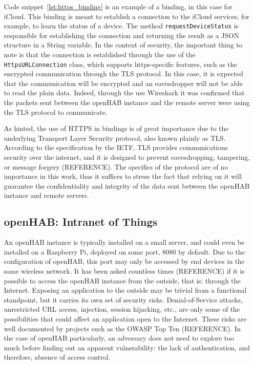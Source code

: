 \documentclass[12pt]{article}
\newcommand{\TODO}{\todo[inline]}
\begin{document}
Code snippet~\ref{lst:https_binding} is an example of a binding, in this case for iCloud. This binding is meant to establish a connection to the iCloud services, for example, to learn the status of a device. The method \texttt{requestDeviceStatus} is responsible for establishing the connection and returning the result as a JSON structure in a String variable. In the context of security, the important thing to note is that the connection is established through the use of the \texttt{HttpsURLConnection} class, which supports https-specific features, such as the encrypted communication through the TLS protocol. In this case, it is expected that the communication will be encrypted and an eavesdropper will not be able to read the plain data. Indeed, through the use Wireshark it was confirmed that the packets sent between the openHAB instance and the remote server were using the TLS protocol to communicate.

As hinted, the use of HTTPS in bindings is of great importance due to the underlying Transport Layer Security protocol, also known plainly as TLS. According to the specification by the IETF, TLS provides communications security over the internet, and it is designed to prevent eavesdropping, tampering, or message forgery (REFERENCE). The specifics of the protocol are of no importance in this work, thus it suffices to stress the fact that relying on it will guarantee the confidentiality and integrity of the data sent between the openHAB instance and remote servers.

\subsection{openHAB: Intranet of Things}

\TODO{REFERENCES}
An openHAB instance is typically installed on a small server, and could even be installed on a Raspberry Pi, deployed on some port, 8080 by default. Due to the configuration of openHAB, this port may only be accessed by end devices in the same wireless network. It has been asked countless times (REFERENCE) if it is possible to access the openHAB instance from the outside, that is: through the Internet. Exposing an application to the outside may be trivial from a functional standpoint, but it carries its own set of security risks. Denial-of-Service attacks, unrestricted URL access, injection, session hijacking, etc., are only some of the possibilities that could affect an application open to the Internet. These risks are well documented by projects such as the OWASP Top Ten (REFERENCE). In the case of openHAB particularly, an adversary does not need to explore too much before finding out an apparent vulnerability: the lack of authentication, and therefore, absence of access control.
\end{document}
